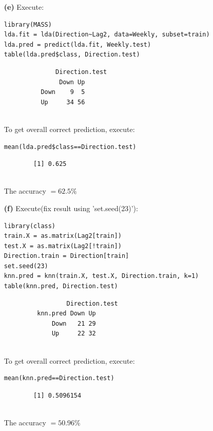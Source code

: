 \documentclass[twoside,11pt]{homework}
\begin{document}
\begin{enumerate}
		\item[\textbf{(e)}] Execute:
		
		\begin{lstlisting}
library(MASS)
lda.fit = lda(Direction~Lag2, data=Weekly, subset=train)
lda.pred = predict(lda.fit, Weekly.test)
table(lda.pred$class, Direction.test)
		\end{lstlisting}
		
		\begin{verbatim}
		      Direction.test
		       Down Up
		  Down    9  5
		  Up     34 56
		  
		\end{verbatim}
		
		To get overall correct prediction, execute:
		
		\begin{lstlisting}
mean(lda.pred$class==Direction.test)
		\end{lstlisting}
		
		\begin{verbatim}
		[1] 0.625
		
		\end{verbatim}
		
		The accuracy $=62.5\%$
		
		\item[\textbf{(f)}] Execute(fix result using 'set.seed(23)'):
		
		\begin{lstlisting}
library(class)
train.X = as.matrix(Lag2[train])
test.X = as.matrix(Lag2[!train])
Direction.train = Direction[train]
set.seed(23)
knn.pred = knn(train.X, test.X, Direction.train, k=1)
table(knn.pred, Direction.test)
		\end{lstlisting}
		
		\begin{verbatim}
		         Direction.test
		 knn.pred Down Up
		     Down   21 29
		     Up     22 32
		    
		\end{verbatim}
		
		To get overall correct prediction, execute:
		
		\begin{lstlisting}
mean(knn.pred==Direction.test)
		\end{lstlisting}
		
		\begin{verbatim}
		[1] 0.5096154
		
		\end{verbatim}
		
		The accuracy $=50.96\%$
		

\end{enumerate}
\end{document}
